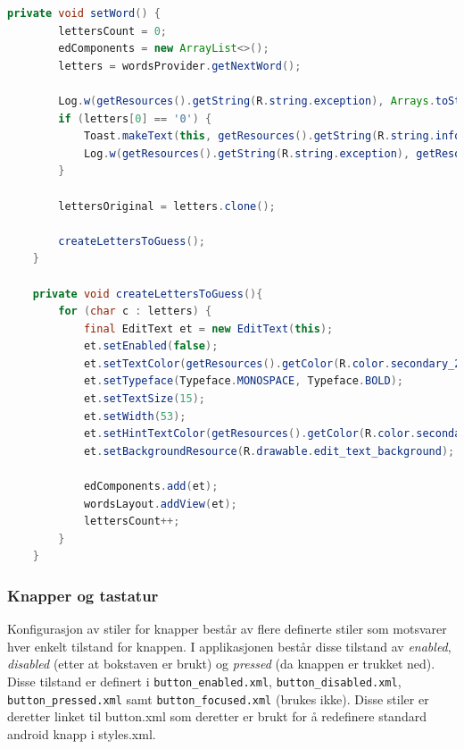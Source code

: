 \begin{lstlisting}[language=Java, caption=Oppretting av dynamisk  \texttt{EditText}, label=code:stil_EditText]
    private void setWord() {
        lettersCount = 0;
        edComponents = new ArrayList<>();
        letters = wordsProvider.getNextWord();
        
        Log.w(getResources().getString(R.string.exception), Arrays.toString(letters)); //Show new word in log view
        if (letters[0] == '0') {
            Toast.makeText(this, getResources().getString(R.string.info_no_more_letters), Toast.LENGTH_SHORT).show();
            Log.w(getResources().getString(R.string.exception), getResources().getString(R.string.info_no_more_letters));
        }

        lettersOriginal = letters.clone();

        createLettersToGuess();
    }
    
    private void createLettersToGuess(){
        for (char c : letters) {
            final EditText et = new EditText(this);
            et.setEnabled(false);
            et.setTextColor(getResources().getColor(R.color.secondary_2_2));
            et.setTypeface(Typeface.MONOSPACE, Typeface.BOLD);
            et.setTextSize(15);
            et.setWidth(53);
            et.setHintTextColor(getResources().getColor(R.color.secondary_2_1));
            et.setBackgroundResource(R.drawable.edit_text_background);

            edComponents.add(et);
            wordsLayout.addView(et);
            lettersCount++;
        }
    }
\end{lstlisting}


\subsubsection*{Knapper og tastatur}
Konfigurasjon av stiler for knapper består av flere definerte stiler som motsvarer hver enkelt tilstand for knappen. I applikasjonen består disse tilstand av \textit{enabled}, \textit{disabled} (etter at bokstaven er brukt) og \textit{pressed} (da knappen er trukket ned). 
Disse tilstand er definert i \texttt{button\_enabled.xml}, \texttt{button\_disabled.xml}, \texttt{button\_pressed.xml} samt \texttt{button\_focused.xml} (brukes ikke).
Disse stiler er deretter linket til button.xml som deretter er brukt for å redefinere standard android knapp i styles.xml.

